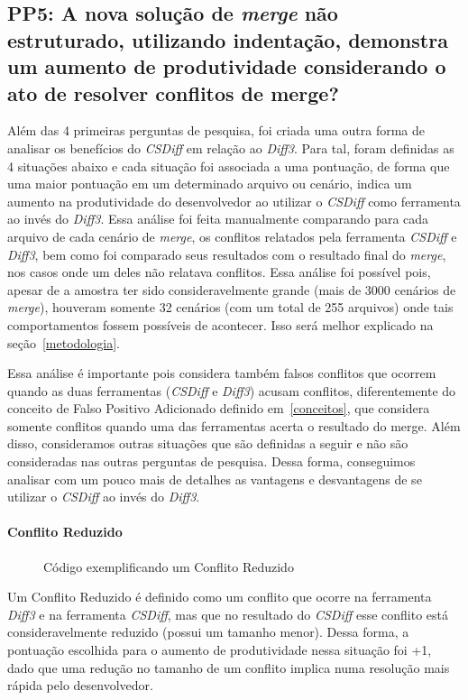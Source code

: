 \subsection{PP5: A nova solução de \emph{merge} não estruturado, utilizando indentação,
	demonstra um aumento de produtividade considerando o ato de resolver conflitos de merge?}\label{concept_PP5}
Além das 4 primeiras perguntas de pesquisa, foi criada uma outra forma de analisar os benefícios do \emph{CSDiff} em relação ao
\emph{Diff3}.
Para tal, foram definidas as 4 situações abaixo e cada situação foi associada a uma pontuação, de forma que
uma maior pontuação em um determinado arquivo ou cenário, indica um aumento na produtividade do desenvolvedor ao
utilizar o \emph{CSDiff} como ferramenta ao invés do \emph{Diff3}. Essa análise foi feita manualmente comparando para cada
arquivo
de cada cenário de \emph{merge}, os conflitos relatados pela
ferramenta \emph{CSDiff} e \emph{Diff3}, bem como foi comparado seus resultados
com o resultado final do \emph{merge}, nos casos onde um deles não relatava conflitos. Essa análise foi possível pois, apesar de
a amostra ter sido consideravelmente grande (mais de 3000 cenários de \emph{merge}), houveram somente 32 cenários (com um total de 255
arquivos) onde tais comportamentos fossem possíveis de acontecer. Isso será melhor explicado na seção~\ref{metodologia}.

Essa análise é importante pois considera também falsos conflitos que ocorrem quando as duas ferramentas (\emph{CSDiff} e \emph{Diff3})
acusam conflitos, diferentemente do conceito de Falso Positivo Adicionado definido em~\ref{conceitos}, que considera somente
conflitos quando uma das ferramentas acerta o resultado do merge.
Além disso, consideramos outras situações que são definidas a seguir e não são consideradas nas outras perguntas de
pesquisa. Dessa forma, conseguimos analisar com um pouco mais de detalhes as
vantagens e desvantagens de se utilizar o \emph{CSDiff} ao invés
do \emph{Diff3}.
\paragraph{Conflito Reduzido}
\begin{figure}[ht]
	\begin{center}
		
		\caption{Código exemplificando um Conflito Reduzido}\label{conflito_reduzido}
	\end{center}
\end{figure}
Um Conflito Reduzido é definido como um conflito que ocorre na ferramenta \emph{Diff3} e na ferramenta \emph{CSDiff},
mas que no resultado do \emph{CSDiff} esse conflito está consideravelmente reduzido (possui um tamanho menor). Dessa forma,
a pontuação escolhida para o aumento de produtividade nessa situação foi +1, dado que uma redução no tamanho de um conflito
implica numa resolução mais rápida pelo desenvolvedor.
